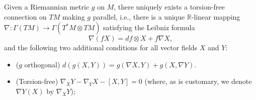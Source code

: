 \begin{theorem}
\label{thm:levi-civita-connection}
\leanok
Given a Riemannian metric $g$ on $M$, there uniquely exists a
torsion-free connection on $TM$ making $g$ parallel, i.e., there is
a unique $\mathbb{R}$-linear mapping $\nabla\colon
\Gamma(TM)\rightarrow \Gamma(T^*M\otimes TM)$ satisfying the Leibniz
formula
\[ \nabla(fX)=df\otimes X+f\nabla X, \]
and the following two additional conditions for all vector fields
$X$ and $Y$:
\begin{itemize}
\item[$\bullet$] ($g$ orthogonal) $d(g(X,Y))=g(\nabla X,Y)+g(X,\nabla
Y)$.
\item[$\bullet$] (Torsion-free) $\nabla_XY-\nabla_YX-[X,Y]=0$
(where, as is customary, we denote $\nabla Y(X)$ by $\nabla_XY$);
\end{itemize}
\end{theorem}

